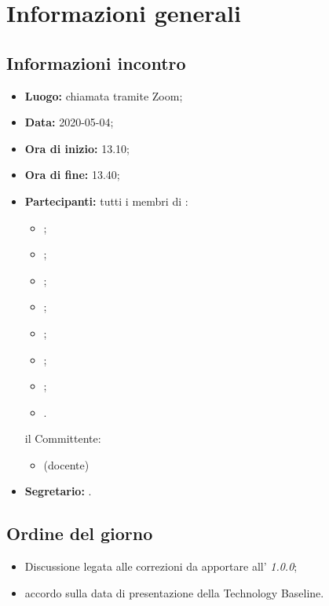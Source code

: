 \section{Informazioni generali}
\subsection{Informazioni incontro}
\begin{itemize}
	\item \textbf{Luogo:} chiamata tramite Zoom;
	\item \textbf{Data:} 2020-05-04;
	\item \textbf{Ora di inizio:} 13.10;
	\item \textbf{Ora di fine:} 13.40;
	\item \textbf{Partecipanti:}
		tutti i membri di \Gruppo:
		\begin{itemize}
			\item \VB;
			\item \LB;
			\item \NF;
			\item \EG;
			\item \FJ;
			\item \MP;
			\item \AS;
			\item \AZ.
		\end{itemize}
		il Committente:
		\begin{itemize}
			\item \RC{} (docente)
		\end{itemize}
	\item \textbf{Segretario:} \AS.
\end{itemize}

\subsection{Ordine del giorno}
\begin{itemize}
	\item Discussione legata alle correzioni da apportare all'\AdR{} \textit{1.0.0};
	\item accordo sulla data di presentazione della Technology Baseline.
\end{itemize}
